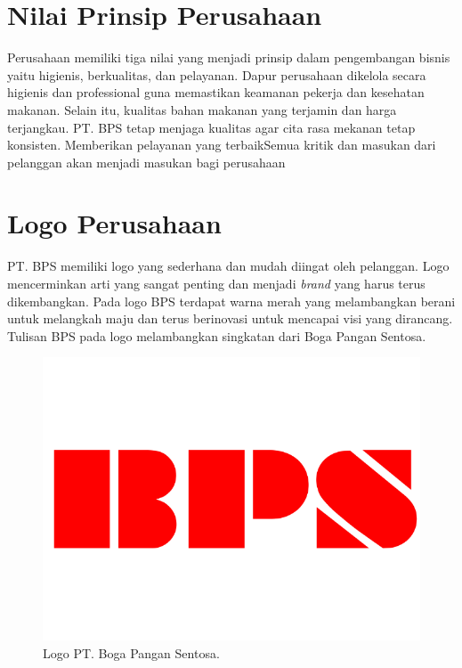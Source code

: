 \section{Nilai Prinsip Perusahaan}
 Perusahaan memiliki tiga nilai yang menjadi prinsip dalam pengembangan bisnis yaitu higienis, 
 berkualitas, dan pelayanan. Dapur perusahaan dikelola secara higienis dan professional guna memastikan 
 keamanan pekerja dan kesehatan makanan. Selain itu, kualitas bahan makanan yang terjamin dan harga terjangkau. 
 PT. BPS tetap menjaga kualitas agar cita rasa mekanan tetap konsisten. Memberikan pelayanan yang terbaikSemua 
 kritik dan masukan dari pelanggan akan menjadi masukan bagi perusahaan

 \section{Logo Perusahaan}
 PT. BPS memiliki logo yang sederhana dan mudah diingat oleh pelanggan. 
 Logo mencerminkan arti yang sangat penting dan menjadi \emph{brand} yang harus terus dikembangkan. 
 Pada logo BPS terdapat warna merah yang melambangkan berani untuk 
 melangkah maju dan terus berinovasi untuk mencapai visi yang dirancang. 
 Tulisan BPS pada logo melambangkan singkatan dari Boga Pangan Sentosa.

\begin{figure}[htbp]
\begin{center}
\includegraphics{img/logo-bps.png}
\caption{Logo PT. Boga Pangan Sentosa.}
\label{gambar:logo-bps}
\end{center}
\end{figure}

